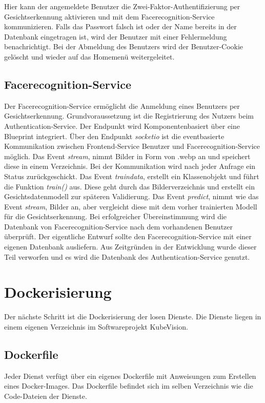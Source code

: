 Hier kann der angemeldete Benutzer die Zwei-Faktor-Authentifizierung per Gesichtserkennung aktivieren und mit dem Facerecognition-Service kommunizieren.
Falls das Passwort falsch ist oder der Name bereits in der Datenbank eingetragen ist, wird der Benutzer mit einer Fehlermeldung benachrichtigt.
Bei der Abmeldung des Benutzers wird der Benutzer-Cookie gelöscht und wieder auf das Homemenü weitergeleitet.

\subsection{Facerecognition-Service}
Der Facerecognition-Service ermöglicht die Anmeldung eines Benutzers per Gesichtserkennung.
Grundvoraussetzung ist die Registrierung des Nutzers beim Authentication-Service.
Der Endpunkt wird Komponentenbasiert über eine Blueprint integriert.
Über den Endpunkt \textit{socketio} ist die eventbasierte Kommunikation zwischen Frontend-Service Benutzer und Facerecognition-Service möglich.
Das Event \textit{stream}, nimmt Bilder in Form von .webp an und speichert diese in einem Verzeichnis.
Bei der Kommunikation wird nach jeder Anfrage ein Status zurückgeschickt.
Das Event \textit{traindata}, erstellt ein Klassenobjekt und führt die Funktion \textit{train()} aus.
Diese geht durch das Bilderverzeichnis und erstellt ein Gesichtsdatenmodell zur späteren Validierung.
Das Event \textit{predict}, nimmt wie das Event \textit{stream}, Bilder an, aber vergleicht diese mit dem vorher trainierten Modell für die Gesichtserkennung.
Bei erfolgreicher Übereinstimmung wird die Datenbank von Facerecognition-Service nach dem vorhandenen Benutzer überprüft.
Der eigentliche Entwurf sollte den Facerecognition-Service mit einer eigenen Datenbank ausliefern.
Aus Zeitgründen in der Entwicklung wurde dieser Teil verworfen und es wird die Datenbank des Authentication-Service genutzt.

\section{Dockerisierung}

Der nächste Schritt ist die Dockerisierung der losen Dienste.
Die Dienste liegen in einem eigenen Verzeichnis im Softwareprojekt KubeVision.

\subsection{Dockerfile}

Jeder Dienst verfügt über ein eigenes Dockerfile mit Anweisungen zum Erstellen eines Docker-Images.
Das Dockerfile befindet sich im selben Verzeichnis wie die Code-Dateien der Dienste.

